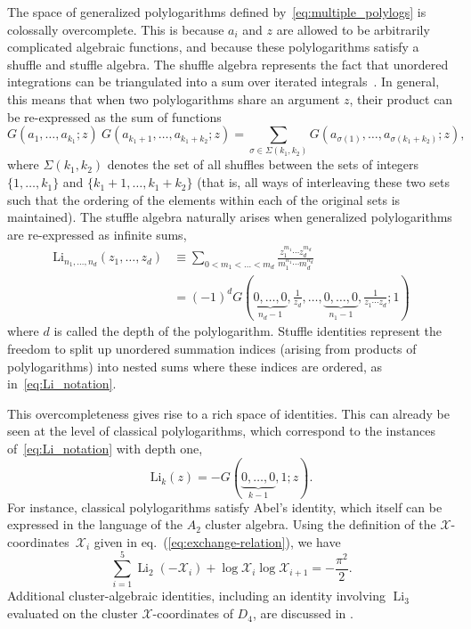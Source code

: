 \documentclass[12pt]{article}
\DeclareMathOperator{\Li}{Li}
\def\x{\mathcal{X}}
\def\xcoords{$\mathcal{X}$-coordinates}
\begin{document}
The space of generalized polylogarithms defined by~\eqref{eq:multiple_polylogs} is colossally overcomplete. This is because $a_i$ and $z$ are allowed to be arbitrarily complicated algebraic functions, and because these polylogarithms satisfy a shuffle and stuffle algebra. The shuffle algebra represents the fact that unordered integrations can be triangulated into a sum over iterated integrals~\cite{Duhr:2011zq,Duhr:2014woa}. In general, this means that when two polylogarithms share an argument $z$, their product can be re-expressed as the sum of functions 
\begin{equation} \label{eq:shuffle_relation}
G(a_1,\dots,a_{k_1};z)\ G(a_{{k_1}+1},\dots,a_{k_1+k_2};z)  = \sum_{\sigma \in \Sigma(k_1,k_2)} G(a_{\sigma(1)},\dots,a_{\sigma(k_1+k_2)};z),
\end{equation}
where $\Sigma(k_1,k_2)$ denotes the set of all shuffles between the sets of integers $\{1,\dots,k_1\}$ and $\{k_1+1,\dots,k_1+k_2\}$ (that is, all ways of interleaving these two sets such that the ordering of the elements within each of the original sets is maintained). The stuffle algebra naturally arises when generalized polylogarithms are re-expressed as infinite sums, 
\begin{align} \label{eq:Li_notation}
\text{Li}_{n_1,\dots,n_d}(z_1,\dots, z_d) &\equiv \sum_{0 < m_1 < \dots < m_d} \frac{z_1^{m_1} \cdots z_d^{m_d}}{m_1^{n_1} \cdots m_d^{n_d}} \\
&= (-1)^d G(\underbrace{0,\dots,0}_{n_d-1},\frac{1}{z_d},\dots,\underbrace{0,\dots,0}_{n_1-1},\frac{1}{z_1 \cdots z_d}; 1) \nonumber
\end{align}
where $d$ is called the depth of the polylogarithm. Stuffle identities represent the freedom to split up unordered summation indices (arising from products of polylogarithms) into nested sums where these indices are ordered, as in~\eqref{eq:Li_notation}.

This overcompleteness gives rise to a rich space of identities. This can already be seen at the level of classical polylogarithms, which correspond to the instances of~\eqref{eq:Li_notation} with depth one,
\begin{equation}
\text{Li}_k(z) = - G(\underbrace{0,\dots,0}_{k-1},1;z) .
\end{equation}
For instance, classical polylogarithms satisfy Abel's identity, which itself can be expressed in the language of the $A_2$ cluster algebra. Using the definition of the \xcoords\ $\x_i$ given in eq.~(\ref{eq:exchange-relation}), we have
\begin{equation}\label{eq:abels-identity}
	\sum_{i=1}^5 \Li_2(-\x_i)+\log\x_i\log\x_{i+1} = -\frac{\pi^2}{2}.
\end{equation}
Additional cluster-algebraic identities, including an identity involving $\Li_3$ evaluated on the cluster $\x$-coordinates of $D_4$, are discussed in \cite{Golden:2013xva,GanglPolylogIdentities}.
\end{document}

